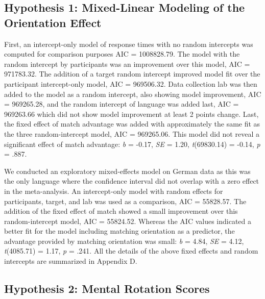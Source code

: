 \documentclass[
  man,mask,floatsintext]{apa7}
\begin{document}
\hypertarget{hypothesis-1-mixed-linear-modeling-of-the-orientation-effect}{%
\subsection{Hypothesis 1: Mixed-Linear Modeling of the Orientation Effect}\label{hypothesis-1-mixed-linear-modeling-of-the-orientation-effect}}

First, an intercept-only model of response times with no random
intercepts was computed for comparison purposes AIC =
1008828.79. The
model with the random intercept by participants was an improvement over
this model, AIC =
971783.32. The
addition of a target random intercept improved model fit over the
participant intercept-only model, AIC =
969506.32. Data
collection lab was then added to the model as a random intercept, also
showing model improvement, AIC =
969265.28, and the
random intercept of language was added last, AIC =
969263.66 which did
not show model improvement at least 2 points change. Last, the fixed
effect of match advantage was added with approximately the same fit as
the three random-intercept model, AIC =
969265.06. This model
did not reveal a significant effect of match advantage: \emph{b} =
-0.17, \emph{SE} =
1.20,
\emph{t}(69830.14) =
-0.14, \emph{p} =
.887.

We conducted an exploratory mixed-effects model on German data as this
was the only language where the confidence interval did not overlap with
a zero effect in the meta-analysis. An intercept-only model with random
effects for participants, target, and lab was used as a comparison, AIC
= 55828.57. The
addition of the fixed effect of match showed a small improvement over
this random-intercept model, AIC =
55824.52.
Whereas the AIC values indicated a better fit for the model including
matching orientation as a predictor, the advantage provided by matching
orientation was small: \emph{b} =
4.84, \emph{SE} =
4.12,
\emph{t}(4085.71) =
1.17, \emph{p} =
.241. All the details of the above fixed
effects and random intercepts are summarized in Appendix D.

\hypertarget{hypothesis-2-mental-rotation-scores}{%
\subsection{Hypothesis 2: Mental Rotation Scores}\label{hypothesis-2-mental-rotation-scores}}
\end{document}
